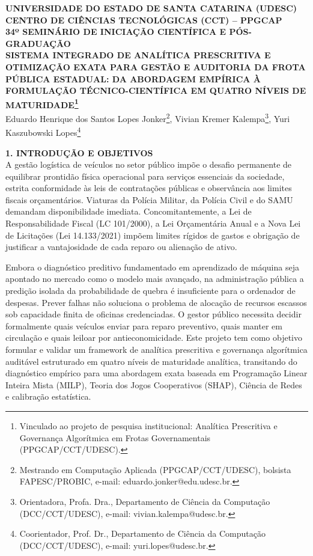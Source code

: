 \documentclass[12pt,a4paper]{article}
\begin{document}
\begin{center}
{\small \textbf{UNIVERSIDADE DO ESTADO DE SANTA CATARINA (UDESC)\\
CENTRO DE CIÊNCIAS TECNOLÓGICAS (CCT) -- PPGCAP\\
34º SEMINÁRIO DE INICIAÇÃO CIENTÍFICA E PÓS-GRADUAÇÃO}}\\[0.8cm]

{\large \textbf{SISTEMA INTEGRADO DE ANALÍTICA PRESCRITIVA E OTIMIZAÇÃO EXATA PARA GESTÃO E AUDITORIA DA FROTA PÚBLICA ESTADUAL: DA ABORDAGEM EMPÍRICA À FORMULAÇÃO TÉCNICO-CIENTÍFICA EM QUATRO NÍVEIS DE MATURIDADE\footnote{Vinculado ao projeto de pesquisa institucional: Analítica Prescritiva e Governança Algorítmica em Frotas Governamentais (PPGCAP/CCT/UDESC).}}}\\[0.5cm]

{\normalsize Eduardo Henrique dos Santos Lopes Jonker\footnote{Mestrando em Computação Aplicada (PPGCAP/CCT/UDESC), bolsista FAPESC/PROBIC, e-mail: eduardo.jonker@edu.udesc.br.}, Vivian Kremer Kalempa\footnote{Orientadora, Profa. Dra., Departamento de Ciência da Computação (DCC/CCT/UDESC), e-mail: vivian.kalempa@udesc.br.}, Yuri Kaszubowski Lopes\footnote{Coorientador, Prof. Dr., Departamento de Ciência da Computação (DCC/CCT/UDESC), e-mail: yuri.lopes@udesc.br.}}\\[0.8cm]
\end{center}

\noindent \textbf{1. INTRODUÇÃO E OBJETIVOS}\\
A gestão logística de veículos no setor público impõe o desafio permanente de equilibrar prontidão física operacional para serviços essenciais da sociedade, estrita conformidade às leis de contratações públicas e observância aos limites fiscais orçamentários. Viaturas da Polícia Militar, da Polícia Civil e do SAMU demandam disponibilidade imediata. Concomitantemente, a Lei de Responsabilidade Fiscal (LC 101/2000), a Lei Orçamentária Anual e a Nova Lei de Licitações (Lei 14.133/2021) impõem limites rígidos de gastos e obrigação de justificar a vantajosidade de cada reparo ou alienação de ativo.

Embora o diagnóstico preditivo fundamentado em aprendizado de máquina seja apontado no mercado como o modelo mais avançado, na administração pública a predição isolada da probabilidade de quebra é insuficiente para o ordenador de despesas. Prever falhas não soluciona o problema de alocação de recursos escassos sob capacidade finita de oficinas credenciadas. O gestor público necessita decidir formalmente quais veículos enviar para reparo preventivo, quais manter em circulação e quais leiloar por antieconomicidade. Este projeto tem como objetivo formular e validar um framework de analítica prescritiva e governança algorítmica auditável estruturado em quatro níveis de maturidade analítica, transitando do diagnóstico empírico para uma abordagem exata baseada em Programação Linear Inteira Mista (MILP), Teoria dos Jogos Cooperativos (SHAP), Ciência de Redes e calibração estatística.\\
\end{document}
